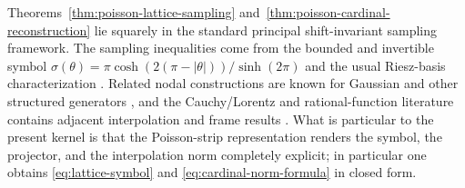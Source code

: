 \begin{remark}
Theorems~\ref{thm:poisson-lattice-sampling}
and~\ref{thm:poisson-cardinal-reconstruction} lie squarely in the
standard principal shift-invariant sampling framework.  The sampling
inequalities come from the bounded and invertible symbol
$\sigma(\theta)=\pi\cosh(2(\pi-|\theta|))/\sinh(2\pi)$ and the usual
Riesz-basis characterization
\cite{deBoorDeVoreRon1994,RonShen1995,AldroubiGrochenig2001,GrochenigRomeroStockler2018}.
Related nodal constructions are known for Gaussian and other structured
generators
\cite{RomeroUlanovskiiZlotnikov2024,BaranovBelovGrochenig2022,GrochenigRomeroStockler2020},
and the Cauchy/Lorentz and rational-function literature contains
adjacent interpolation and frame results
\cite{KiselevMininNovikov2016,KiselevMininNovikov2019,BelovKulikovLyubarskii2022,BelovKulikovLyubarskii2023,UlanovskiiZlotnikov2025}.
What is particular to the present kernel is that the Poisson-strip
representation renders the symbol, the projector, and the interpolation
norm completely explicit; in particular one obtains
\eqref{eq:lattice-symbol} and \eqref{eq:cardinal-norm-formula} in
closed form.
\end{remark}
